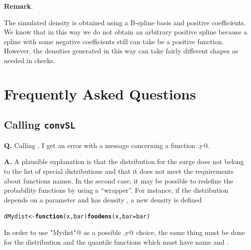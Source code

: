 \documentclass[11pt,a4paper]{report}\usepackage[]{graphicx}\usepackage[]{color}
\makeatletter
\newcommand{\hlstd}[1]{\textcolor[rgb]{0.345,0.345,0.345}{#1}}%
\newcommand{\hlkwa}[1]{\textcolor[rgb]{0.161,0.373,0.58}{\textbf{#1}}}%
\newcommand{\hlkwb}[1]{\textcolor[rgb]{0.69,0.353,0.396}{#1}}%
\newcommand{\hlkwc}[1]{\textcolor[rgb]{0.333,0.667,0.333}{#1}}%
\newcommand{\hlkwd}[1]{\textcolor[rgb]{0.737,0.353,0.396}{\textbf{#1}}}%
\newenvironment{kframe}{%
 \def\at@end@of@kframe{}%
 \ifinner\ifhmode%
  \def\at@end@of@kframe{\end{minipage}}%
  \begin{minipage}{\columnwidth}%
 \fi\fi%
 \def\FrameCommand##1{\hskip\@totalleftmargin \hskip-\fboxsep
 \colorbox{shadecolor}{##1}\hskip-\fboxsep
     \hskip-\linewidth \hskip-\@totalleftmargin \hskip\columnwidth}%
 \MakeFramed {\advance\hsize-\width
   \@totalleftmargin\z@ \linewidth\hsize
   \@setminipage}}%
 {\par\unskip\endMakeFramed%
 \at@end@of@kframe}
\newenvironment{knitrout}{}{} %
\newenvironment{remark}
   {\medskip \par \noindent%
    \small\textbf{Remark}.%
   }%
   {\par \noindent}
\makeatother
\begin{document}
\begin{remark}
  The simulated density is obtained using a B-spline basis and
  positive coefficients. We know that in this way we do not obtain an
  arbitrary positive spline because a spline with some negative
  coefficients still can take be a positive function. However, the densities
  generated in this way can take fairly different shapes as needed in
  checks.
\end{remark}


\chapter{Frequently Asked Questions}
\section{Calling \texttt{convSL}}
\noindent
\textbf{Q.} Calling \verb@convSL@, I get an error with a message 
concerning a function \verb@qfun.y@.
\par\medskip\noindent
\textbf{A.} A plausible explanation is that the distribution for the
surge does not belong to the list of special distributions and that it
does not meet the requirements about functions names. In the second
case, it may be possible to redefine the probability functions by
using a ``wrapper''. For instance, if the distribution depends on a
parameter \verb@bar@ and has density \verb@foodens@, a new density is
defined 
\begin{knitrout}
\color{fgcolor}\begin{kframe}
\begin{alltt}
\hlstd{dMydist} \hlkwb{<-} \hlkwa{function}\hlstd{(}\hlkwc{x}\hlstd{,} \hlkwc{bar}\hlstd{)} \hlkwd{foodens}\hlstd{(x,} \hlkwc{bar} \hlstd{= bar)}
\end{alltt}
\end{kframe}
\end{knitrout}
In order to use \verb@"Mydist"@ as a possible \verb@distname.y@ choice, 
the same thing must be done for the
distribution and the quantile functions which must have name
\verb@pMydist@ and \verb@qMydist@.
\end{document}
